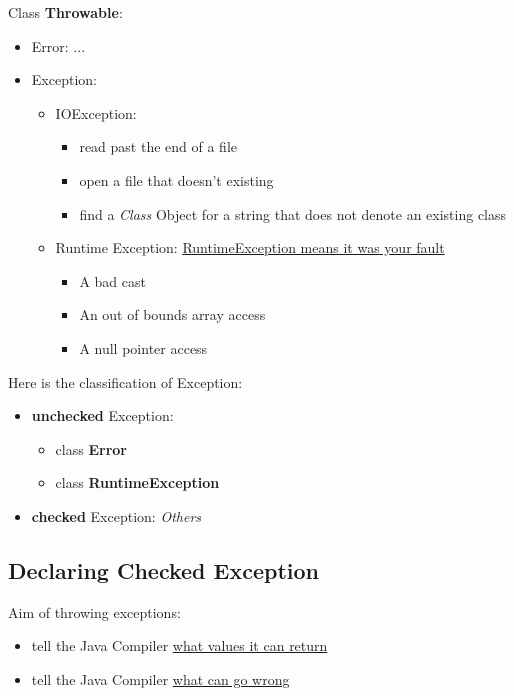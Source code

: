 \documentclass[12pt]{article}
\begin{document}
Class \textbf{Throwable}:
\begin{itemize}
    \item Error: ...
    \item Exception: 
    \begin{itemize}
        \item IOException:
        \begin{itemize}
            \item read past the end of a file
            \item open a file that doesn't existing
            \item find a \textit{Class} Object for a string that does not denote an existing class 
        \end{itemize}
        \item Runtime Exception: \underline{RuntimeException means it was your fault}
        \begin{itemize}
            \item A bad cast
            \item An out of bounds array access
            \item A null pointer access
        \end{itemize}
    \end{itemize}
\end{itemize}

Here is the classification of Exception:
\begin{itemize}
    \item \textbf{unchecked} Exception:
    \begin{itemize}
        \item class \textbf{Error}
        \item class \textbf{RuntimeException}
    \end{itemize}
    \item \textbf{checked} Exception: \textit{Others}
\end{itemize}

\subsection{Declaring Checked Exception}
Aim of throwing exceptions:
\begin{itemize}
    \item tell the Java Compiler \underline{what values it can return}
    \item tell the Java Compiler \underline{what can go wrong}
\end{itemize}
\end{document}

